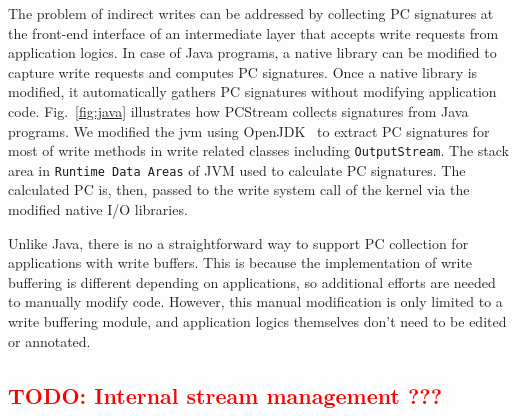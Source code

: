 The problem of indirect writes can be addressed by collecting PC signatures at
the front-end interface of an intermediate layer that accepts write requests
from application logics. In case of Java programs, a native library can be
modified to capture write requests and computes PC signatures. Once a native
library is modified, it automatically gathers PC signatures without modifying
application code. Fig.~\ref{fig:java} illustrates how \textsf{PCStream}
collects signatures from Java programs.  
We modified the jvm using OpenJDK~\cite{OpenJDK} to extract PC signatures for 
most of write methods in write related classes including \texttt{OutputStream}.
The stack area in \texttt{Runtime Data Areas} of JVM used to calculate PC signatures.
The calculated PC is, then, passed to the write system call of the kernel via
the modified native I/O libraries.

Unlike Java, there is no a straightforward way to support PC collection for
applications with write buffers. This is because the implementation of write
buffering is different depending on applications, so additional efforts are
needed to manually modify code. However, this manual modification is only
limited to a write buffering module, and application logics themselves don't
need to be edited or annotated.



\subsection{\textcolor{red}{TODO: Internal stream management ???}}




